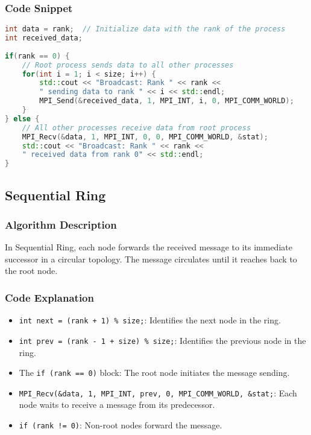 \documentclass[11pt]{article}
\begin{document}
\subsubsection{Code Snippet}
\begin{lstlisting}[language=C++, caption=Key part of Sequential Broadcast]
int data = rank;  // Initialize data with the rank of the process
int received_data;
    
if(rank == 0) {
    // Root process sends data to all other processes
    for(int i = 1; i < size; i++) {
        std::cout << "Broadcast: Rank " << rank << 
        " sending data to rank " << i << std::endl;
        MPI_Send(&received_data, 1, MPI_INT, i, 0, MPI_COMM_WORLD);
    }
} else {
    // All other processes receive data from root process
    MPI_Recv(&data, 1, MPI_INT, 0, 0, MPI_COMM_WORLD, &stat);
    std::cout << "Broadcast: Rank " << rank << 
    " received data from rank 0" << std::endl;
}
\end{lstlisting}

\subsection{Sequential Ring}

\subsubsection{Algorithm Description}
In Sequential Ring, each node forwards the received message to its immediate successor in a circular topology. The message circulates until it reaches back to the root node.

\subsubsection{Code Explanation}

\begin{itemize}
    \item \texttt{int next = (rank + 1) \% size;}: Identifies the next node in the ring.
    \item \texttt{int prev = (rank - 1 + size) \% size;}: Identifies the previous node in the ring.
    \item The \texttt{if (rank == 0)} block: The root node initiates the message sending.
    \item \texttt{MPI\_Recv(\&data, 1, MPI\_INT, prev, 0, MPI\_COMM\_WORLD, \&stat;}: Each node waits to receive a message from its predecessor.
    \item \texttt{if (rank != 0)}: Non-root nodes forward the message.
\end{itemize}
\end{document}
